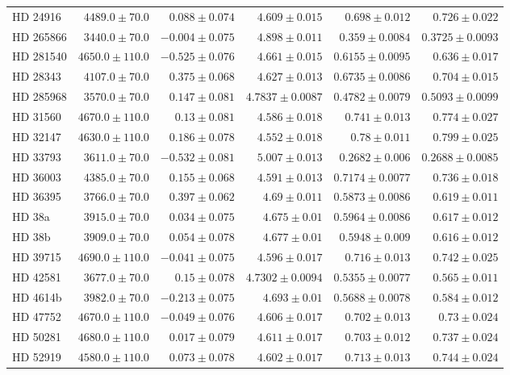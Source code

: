 \begin{longtable*}{lrrrrr}
HD 24916 & $4489.0\pm 70.0$ & $0.088\pm 0.074$ & $4.609\pm 0.015$ & $0.698\pm 0.012$ & $0.726\pm 0.022$ \\ 
HD 265866 & $3440.0\pm 70.0$ & $-0.004\pm 0.075$ & $4.898\pm 0.011$ & $0.359\pm 0.0084$ & $0.3725\pm 0.0093$ \\ 
HD 281540 & $4650.0\pm 110.0$ & $-0.525\pm 0.076$ & $4.661\pm 0.015$ & $0.6155\pm 0.0095$ & $0.636\pm 0.017$ \\ 
HD 28343 & $4107.0\pm 70.0$ & $0.375\pm 0.068$ & $4.627\pm 0.013$ & $0.6735\pm 0.0086$ & $0.704\pm 0.015$ \\ 
HD 285968 & $3570.0\pm 70.0$ & $0.147\pm 0.081$ & $4.7837\pm 0.0087$ & $0.4782\pm 0.0079$ & $0.5093\pm 0.0099$ \\ 
HD 31560 & $4670.0\pm 110.0$ & $0.13\pm 0.081$ & $4.586\pm 0.018$ & $0.741\pm 0.013$ & $0.774\pm 0.027$ \\ 
HD 32147 & $4630.0\pm 110.0$ & $0.186\pm 0.078$ & $4.552\pm 0.018$ & $0.78\pm 0.011$ & $0.799\pm 0.025$ \\ 
HD 33793 & $3611.0\pm 70.0$ & $-0.532\pm 0.081$ & $5.007\pm 0.013$ & $0.2682\pm 0.006$ & $0.2688\pm 0.0085$ \\ 
HD 36003 & $4385.0\pm 70.0$ & $0.155\pm 0.068$ & $4.591\pm 0.013$ & $0.7174\pm 0.0077$ & $0.736\pm 0.018$ \\ 
HD 36395 & $3766.0\pm 70.0$ & $0.397\pm 0.062$ & $4.69\pm 0.011$ & $0.5873\pm 0.0086$ & $0.619\pm 0.011$ \\ 
HD 38a & $3915.0\pm 70.0$ & $0.034\pm 0.075$ & $4.675\pm 0.01$ & $0.5964\pm 0.0086$ & $0.617\pm 0.012$ \\ 
HD 38b & $3909.0\pm 70.0$ & $0.054\pm 0.078$ & $4.677\pm 0.01$ & $0.5948\pm 0.009$ & $0.616\pm 0.012$ \\ 
HD 39715 & $4690.0\pm 110.0$ & $-0.041\pm 0.075$ & $4.596\pm 0.017$ & $0.716\pm 0.013$ & $0.742\pm 0.025$ \\ 
HD 42581 & $3677.0\pm 70.0$ & $0.15\pm 0.078$ & $4.7302\pm 0.0094$ & $0.5355\pm 0.0077$ & $0.565\pm 0.011$ \\ 
HD 4614b & $3982.0\pm 70.0$ & $-0.213\pm 0.075$ & $4.693\pm 0.01$ & $0.5688\pm 0.0078$ & $0.584\pm 0.012$ \\ 
HD 47752 & $4670.0\pm 110.0$ & $-0.049\pm 0.076$ & $4.606\pm 0.017$ & $0.702\pm 0.013$ & $0.73\pm 0.024$ \\ 
HD 50281 & $4680.0\pm 110.0$ & $0.017\pm 0.079$ & $4.611\pm 0.017$ & $0.703\pm 0.012$ & $0.737\pm 0.024$ \\ 
HD 52919 & $4580.0\pm 110.0$ & $0.073\pm 0.078$ & $4.602\pm 0.017$ & $0.713\pm 0.013$ & $0.744\pm 0.024$ \\ 

\end{longtable*}
